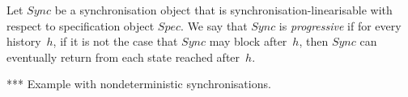 
\begin{definition}
Let $Sync$ be a synchronisation object that is synchronisation-linearisable
with respect to specification object $Spec$.  We say that $Sync$ is
\emph{progressive} if for every history~$h$, if it is not the case that $Sync$
may block after~$h$, then $Sync$ can eventually return from each state reached
after~$h$.
\end{definition}

*** Example with nondeterministic synchronisations.







